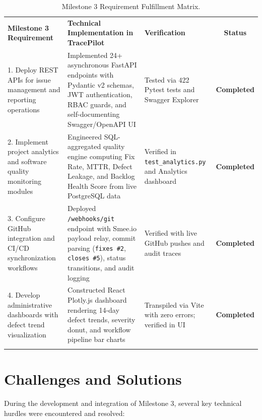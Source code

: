 \documentclass[11pt,a4paper]{article}
\providecommand{\toprule}{\noalign{\hrule height 1.2pt}}
\providecommand{\midrule}{\noalign{\hrule height 0.6pt}}
\providecommand{\bottomrule}{\noalign{\hrule height 1.2pt}}
\providecommand{\addlinespace}{\vspace{4pt}}
\begin{document}
\begin{table}[htbp]
\centering
\small
\caption{Milestone 3 Requirement Fulfillment Matrix.}
\label{tab:milestone3_outcomes}
\begin{tabularx}{\textwidth}{p{3.5cm}Xp{3.2cm}c}
\toprule
\textbf{Milestone 3 Requirement} & \textbf{Technical Implementation in TracePilot} & \textbf{Verification} & \textbf{Status} \\
\midrule
1. Deploy REST APIs for issue management and reporting operations & Implemented 24+ asynchronous FastAPI endpoints with Pydantic v2 schemas, JWT authentication, RBAC guards, and self-documenting Swagger/OpenAPI UI & Tested via 422 Pytest tests and Swagger Explorer & \textbf{Completed} \\
\addlinespace
2. Implement project analytics and software quality monitoring modules & Engineered SQL-aggregated quality engine computing Fix Rate, MTTR, Defect Leakage, and Backlog Health Score from live PostgreSQL data & Verified in \texttt{test\_analytics.py} and Analytics dashboard & \textbf{Completed} \\
\addlinespace
3. Configure GitHub integration and CI/CD synchronization workflows & Deployed \texttt{/webhooks/git} endpoint with Smee.io payload relay, commit parsing (\texttt{fixes \#2}, \texttt{closes \#5}), status transitions, and audit logging & Verified with live GitHub pushes and audit traces & \textbf{Completed} \\
\addlinespace
4. Develop administrative dashboards with defect trend visualization & Constructed React Plotly.js dashboard rendering 14-day defect trends, severity donut, and workflow pipeline bar charts & Transpiled via Vite with zero errors; verified in UI & \textbf{Completed} \\
\bottomrule
\end{tabularx}
\end{table}

\section{Challenges and Solutions}
During the development and integration of Milestone 3, several key technical hurdles were encountered and resolved:
\end{document}
